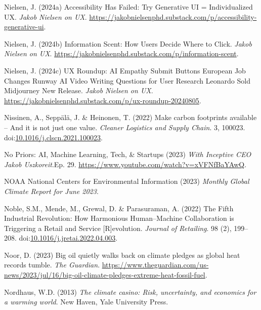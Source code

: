 \documentclass[
  letterpaper,
  DIV=11,
  numbers=noendperiod]{scrartcl}
\newlength{\cslhangindent}
\newenvironment{CSLReferences}[2] %
 {\begin{list}{}{%
  \setlength{\itemindent}{0pt}
  \setlength{\leftmargin}{0pt}
  \setlength{\parsep}{0pt}
  \ifodd #1
   \setlength{\leftmargin}{\cslhangindent}
   \setlength{\itemindent}{-1\cslhangindent}
  \fi
  \setlength{\itemsep}{#2\baselineskip}}}
 {\end{list}}
\begin{document}
\begin{CSLReferences}{0}{1}
Nielsen, J. (2024a) Accessibility {Has Failed}: {Try Generative UI} =
{Individualized UX}. \emph{Jakob Nielsen on UX}.
\url{https://jakobnielsenphd.substack.com/p/accessibility-generative-ui}.

Nielsen, J. (2024b) Information {Scent}: {How Users Decide Where} to
{Click}. \emph{Jakob Nielsen on UX}.
\url{https://jakobnielsenphd.substack.com/p/information-scent}.

Nielsen, J. (2024c) {UX Roundup}: {AI Empathy} {\textbar} {Submit
Buttons} {\textbar} {European Job Changes} {\textbar} {Runway AI Video}
{\textbar} {Writing Questions} for {User Research} {\textbar} {Leonardo
Sold} {\textbar} {Midjourney New Release}. \emph{Jakob Nielsen on UX}.
\url{https://jakobnielsenphd.substack.com/p/ux-roundup-20240805}.

Nissinen, A., Seppälä, J. \& Heinonen, T. (2022) Make carbon footprints
available -- {And} it is not just one value. \emph{Cleaner Logistics and
Supply Chain}. 3, 100023.
doi:\href{https://doi.org/10.1016/j.clscn.2021.100023}{10.1016/j.clscn.2021.100023}.

No Priors: AI, Machine Learning, Tech, \& Startups (2023) \emph{With
{Inceptive CEO Jakob Uszkoreit}}.Ep. 29.
\url{https://www.youtube.com/watch?v=xVFNfBaYAwQ}.

NOAA National Centers for Environmental Information (2023) \emph{Monthly
{Global Climate Report} for {June} 2023}.

Noble, S.M., Mende, M., Grewal, D. \& Parasuraman, A. (2022) The {Fifth
Industrial Revolution}: {How Harmonious Human}--{Machine Collaboration}
is {Triggering} a {Retail} and {Service} {[}{R}{]}evolution.
\emph{Journal of Retailing}. 98 (2), 199--208.
doi:\href{https://doi.org/10.1016/j.jretai.2022.04.003}{10.1016/j.jretai.2022.04.003}.

Noor, D. (2023) Big oil quietly walks back on climate pledges as global
heat records tumble. \emph{The Guardian}.
\url{https://www.theguardian.com/us-news/2023/jul/16/big-oil-climate-pledges-extreme-heat-fossil-fuel}.

Nordhaus, W.D. (2013) \emph{The climate casino: Risk, uncertainty, and
economics for a warming world}. New Haven, Yale University Press.


\end{CSLReferences}
\end{document}
